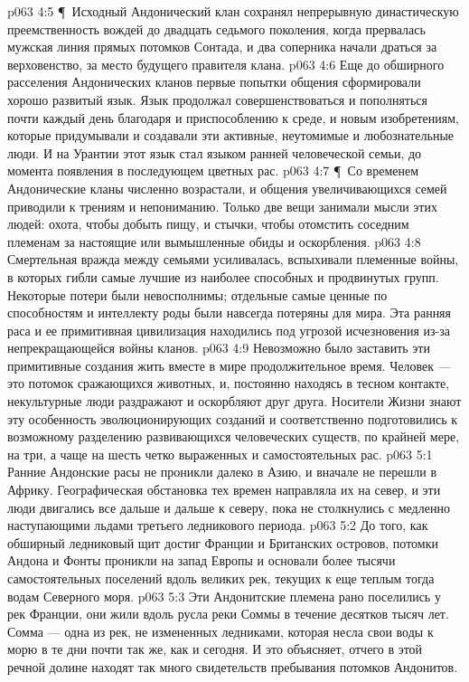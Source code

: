 \vs p063 4:5 \P\ Исходный Андонический клан сохранял непрерывную династическую преемственность вождей до двадцать седьмого поколения, когда прервалась мужская линия прямых потомков Сонтада, и два соперника начали драться за верховенство, за место будущего правителя клана.
\vs p063 4:6 Еще до обширного расселения Андонических кланов первые попытки общения сформировали хорошо развитый язык. Язык продолжал совершенствоваться и пополняться почти каждый день благодаря и приспособлению к среде, и новым изобретениям, которые придумывали и создавали эти активные, неутомимые и любознательные люди. И на Урантии этот язык стал языком ранней человеческой семьи, до момента появления в последующем цветных рас.
\vs p063 4:7 \P\ Со временем Андонические кланы численно возрастали, и общения увеличивающихся семей приводили к трениям и непониманию. Только две вещи занимали мысли этих людей: охота, чтобы добыть пищу, и стычки, чтобы отомстить соседним племенам за настоящие или вымышленные обиды и оскорбления.
\vs p063 4:8 Смертельная вражда между семьями усиливалась, вспыхивали племенные войны, в которых гибли самые лучшие из наиболее способных и продвинутых групп. Некоторые потери были невосполнимы; отдельные самые ценные по способностям и интеллекту роды были навсегда потеряны для мира. Эта ранняя раса и ее примитивная цивилизация находились под угрозой исчезновения из\hyp{}за непрекращающейся войны кланов.
\vs p063 4:9 Невозможно было заставить эти примитивные создания жить вместе в мире продолжительное время. Человек --- это потомок сражающихся животных, и, постоянно находясь в тесном контакте, некультурные люди раздражают и оскорбляют друг друга. Носители Жизни знают эту особенность эволюционирующих созданий и соответственно подготовились к возможному разделению развивающихся человеческих существ, по крайней мере, на три, а чаще на шесть четко выраженных и самостоятельных рас.
\vs p063 5:1 Ранние Андонские расы не проникли далеко в Азию, и вначале не перешли в Африку. Географическая обстановка тех времен направляла их на север, и эти люди двигались все дальше и дальше к северу, пока не столкнулись с медленно наступающими льдами третьего ледникового периода.
\vs p063 5:2 До того, как обширный ледниковый щит достиг Франции и Британских островов, потомки Андона и Фонты проникли на запад Европы и основали более тысячи самостоятельных поселений вдоль великих рек, текущих к еще теплым тогда водам Северного моря.
\vs p063 5:3 Эти Андонитские племена рано поселились у рек Франции, они жили вдоль русла реки Соммы в течение десятков тысяч лет. Сомма --- одна из рек, не измененных ледниками, которая несла свои воды к морю в те дни почти так же, как и сегодня. И это объясняет, отчего в этой речной долине находят так много свидетельств пребывания потомков Андонитов.
